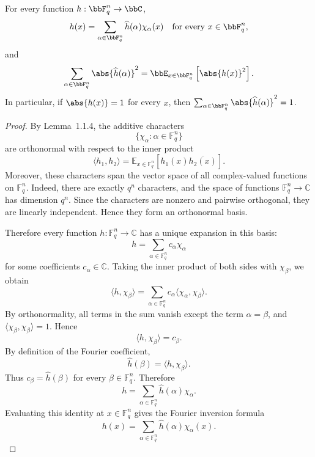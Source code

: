\begin{lemma}
\label{lem:fourier-inversion-parseval}
For every function $h:\bbF_q^n\to\bbC$,
\[
    h(x)=\sum_{\alpha\in\bbF_q^n}\widehat h(\alpha)\chi_\alpha(x)
    \quad\text{for every }x\in\bbF_q^n,
\]
and
\[
    \sum_{\alpha\in\bbF_q^n}\abs{\widehat h(\alpha)}^2
    = \bbE_{x\in\bbF_q^n}\left[\abs{h(x)}^2\right].
\]
In particular, if $\abs{h(x)}=1$ for every $x$, then
$\sum_{\alpha\in\bbF_q^n}\abs{\widehat h(\alpha)}^2=1$.
\end{lemma}

\begin{proof}
By Lemma~1.1.4, the additive characters
\[
    \{\chi_\alpha : \alpha \in \mathbb F_q^n\}
\]
are orthonormal with respect to the inner product
\[
    \langle h_1,h_2\rangle
    =
    \mathbb E_{x\in \mathbb F_q^n}
    \left[h_1(x)\overline{h_2(x)}\right].
\]
Moreover, these characters span the vector space of all complex-valued
functions on \(\mathbb F_q^n\). Indeed, there are exactly \(q^n\) characters,
and the space of functions \(\mathbb F_q^n\to\mathbb C\) has dimension \(q^n\).
Since the characters are nonzero and pairwise orthogonal, they are linearly
independent. Hence they form an orthonormal basis.

Therefore every function \(h:\mathbb F_q^n\to\mathbb C\) has a unique expansion
in this basis:
\[
    h
    =
    \sum_{\alpha\in\mathbb F_q^n}
        c_\alpha \chi_\alpha
\]
for some coefficients \(c_\alpha\in\mathbb C\). Taking the inner product of
both sides with \(\chi_\beta\), we obtain
\[
    \langle h,\chi_\beta\rangle
    =
    \sum_{\alpha\in\mathbb F_q^n}
        c_\alpha \langle \chi_\alpha,\chi_\beta\rangle .
\]
By orthonormality, all terms in the sum vanish except the term
\(\alpha=\beta\), and \(\langle \chi_\beta,\chi_\beta\rangle=1\). Hence
\[
    \langle h,\chi_\beta\rangle = c_\beta .
\]
By definition of the Fourier coefficient,
\[
    \widehat h(\beta)=\langle h,\chi_\beta\rangle .
\]
Thus \(c_\beta=\widehat h(\beta)\) for every
\(\beta\in\mathbb F_q^n\). Therefore
\[
    h
    =
    \sum_{\alpha\in\mathbb F_q^n}
        \widehat h(\alpha)\chi_\alpha .
\]
Evaluating this identity at \(x\in\mathbb F_q^n\) gives the Fourier inversion
formula
\[
    h(x)
    =
    \sum_{\alpha\in\mathbb F_q^n}
        \widehat h(\alpha)\chi_\alpha(x).
\]


\end{proof}
